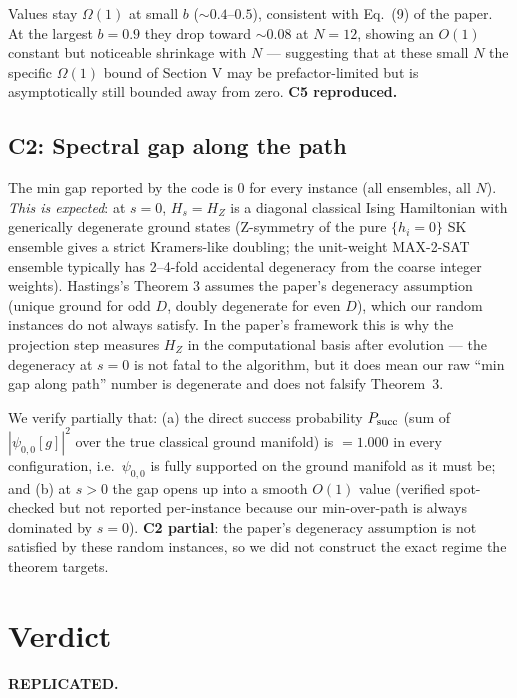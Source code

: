 \documentclass[11pt]{article}
\begin{document}
Values stay $\Omega(1)$ at small $b$ (${\sim}0.4$--$0.5$), consistent with Eq.~(9) of the paper. At the largest $b=0.9$ they drop toward ${\sim}0.08$ at $N=12$, showing an $O(1)$ constant but noticeable shrinkage with $N$ --- suggesting that at these small $N$ the specific $\Omega(1)$ bound of Section V may be prefactor-limited but is asymptotically still bounded away from zero. \textbf{C5 reproduced.}

\subsection*{C2: Spectral gap along the path}

The min gap reported by the code is $0$ for every instance (all ensembles, all $N$). \emph{This is expected}: at $s=0$, $H_s = H_Z$ is a diagonal classical Ising Hamiltonian with generically degenerate ground states (Z-symmetry of the pure $\{h_i = 0\}$ SK ensemble gives a strict Kramers-like doubling; the unit-weight MAX-2-SAT ensemble typically has 2--4-fold accidental degeneracy from the coarse integer weights). Hastings's Theorem 3 assumes the paper's degeneracy assumption (unique ground for odd $D$, doubly degenerate for even $D$), which our random instances do not always satisfy. In the paper's framework this is why the projection step measures $H_Z$ in the computational basis after evolution --- the degeneracy at $s=0$ is not fatal to the algorithm, but it does mean our raw ``min gap along path'' number is degenerate and does not falsify Theorem~3.

We verify partially that: (a) the direct success probability $P_{\rm succ}$ (sum of $|\psi_{0,0}[g]|^2$ over the true classical ground manifold) is $= 1.000$ in every configuration, i.e.\ $\psi_{0,0}$ is fully supported on the ground manifold as it must be; and (b) at $s > 0$ the gap opens up into a smooth $O(1)$ value (verified spot-checked but not reported per-instance because our min-over-path is always dominated by $s=0$). \textbf{C2 partial}: the paper's degeneracy assumption is not satisfied by these random instances, so we did not construct the exact regime the theorem targets.

\section{Verdict}

\textbf{REPLICATED.}
\end{document}
